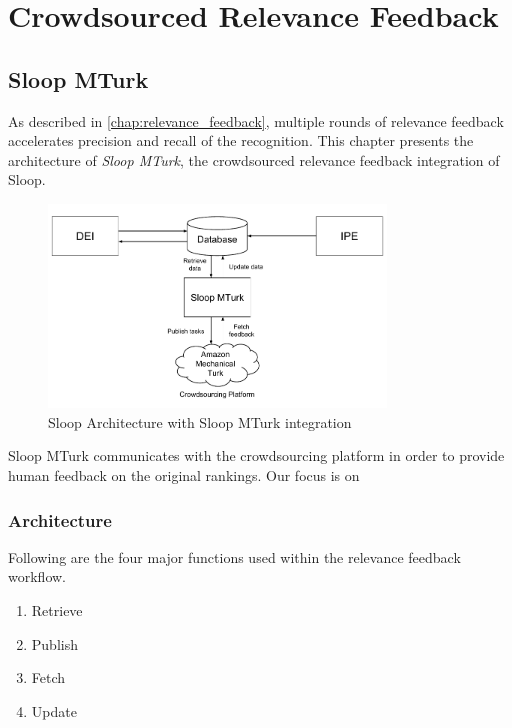 \graphicspath{{./images/chap5/}}
\chapter{Crowdsourced Relevance Feedback}
\label{chap:sloop_mturk}
\section{Sloop MTurk}

As described in \ref{chap:relevance_feedback}, multiple rounds of relevance
feedback accelerates precision and recall of the recognition. This chapter
presents the architecture of \emph{Sloop MTurk}, the crowdsourced relevance
feedback integration of Sloop. 

\begin{figure}[h]
  \centering
  \includegraphics[width=0.8\textwidth]{sloop/turk_system}
  \caption{Sloop Architecture with Sloop MTurk integration}
  \label{fig:turk_overview}
\end{figure}

Sloop MTurk communicates with the crowdsourcing platform in order to provide
human feedback on the original rankings. Our focus is on 

\subsection{Architecture}

Following are the four major functions used within the relevance feedback
workflow.
\begin{enumerate}
	\item Retrieve
	\item Publish
	\item Fetch
	\item Update
\end{enumerate}

